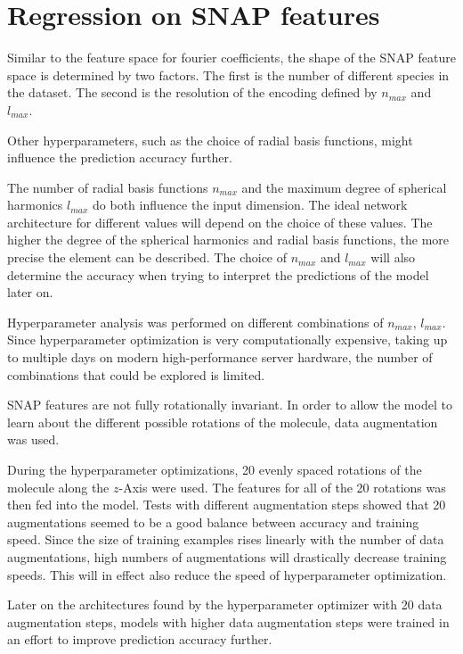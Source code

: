 \section{Regression on SNAP features}
\label{sec:Evaluation:snap}

Similar to the feature space for fourier coefficients, the shape of the SNAP feature space is determined by two factors.
The first is the number of different species in the dataset.
The second is the resolution of the encoding defined by $n_{max}$ and $l_{max}$.

Other hyperparameters, such as the choice of radial basis functions, might influence the prediction accuracy further.

The number of radial basis functions $n_{max}$ and the maximum degree of spherical harmonics $l_{max}$ do both influence
the input dimension.
The ideal network architecture for different values will depend on the choice of these values.
The higher the degree of the spherical harmonics and radial basis functions, the more precise the element can be described. %
The choice of $n_{max}$ and $l_{max}$ will also determine the accuracy when trying to interpret the predictions of the model later on.

Hyperparameter analysis was performed on different combinations of $n_{max}$, $l_{max}$.
Since hyperparameter optimization is very computationally expensive, taking up to multiple days on modern high-performance 
server hardware, the number of combinations that could be explored is limited.

SNAP features are not fully rotationally invariant.
In order to allow the model to learn about the different possible rotations of the molecule, data augmentation was used.

During the hyperparameter optimizations, 20 evenly spaced rotations of the molecule along the $z$-Axis were used.
The features for all of the 20 rotations was then fed into the model.
Tests with different augmentation steps showed that 20 augmentations seemed to be a good balance between 
accuracy and training speed.
Since the size of training examples rises linearly with the number of data augmentations,
high numbers of augmentations will drastically decrease training speeds.
This will in effect also reduce the speed of hyperparameter optimization.

Later on the architectures found by the hyperparameter optimizer with 20 data augmentation steps, 
models with higher data augmentation steps were trained in an effort to improve prediction accuracy further.

